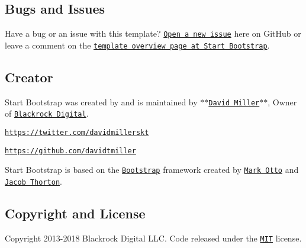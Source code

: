 \subsection*{Bugs and Issues}

Have a bug or an issue with this template? \href{https://github.com/BlackrockDigital/startbootstrap-sb-admin-2/issues}{\tt Open a new issue} here on Git\-Hub or leave a comment on the \href{http://startbootstrap.com/template-overviews/sb-admin-2/}{\tt template overview page at Start Bootstrap}.

\subsection*{Creator}

Start Bootstrap was created by and is maintained by $\ast$$\ast$\href{http://davidmiller.io/}{\tt David Miller}$\ast$$\ast$, Owner of \href{http://blackrockdigital.io/}{\tt Blackrock Digital}.


\begin{DoxyItemize}
\item \href{https://twitter.com/davidmillerskt}{\tt https\-://twitter.\-com/davidmillerskt}
\item \href{https://github.com/davidtmiller}{\tt https\-://github.\-com/davidtmiller}
\end{DoxyItemize}

Start Bootstrap is based on the \href{http://getbootstrap.com/}{\tt Bootstrap} framework created by \href{https://twitter.com/mdo}{\tt Mark Otto} and \href{https://twitter.com/fat}{\tt Jacob Thorton}.

\subsection*{Copyright and License}

Copyright 2013-\/2018 Blackrock Digital L\-L\-C. Code released under the \href{https://github.com/BlackrockDigital/startbootstrap-sb-admin-2/blob/gh-pages/LICENSE}{\tt M\-I\-T} license. 